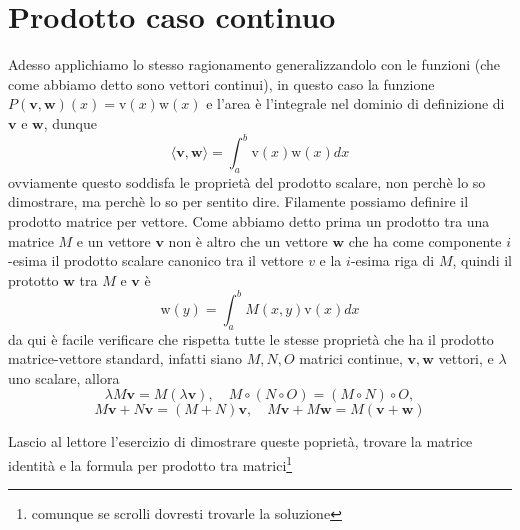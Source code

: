 \documentclass[11pt,a4paper]{report}
\newcommand{\vettore}[1]{\mathbf{#1}}
\newcommand{\vettorec}[1]{\textrm{#1}}
\newcommand{\pscal}[2]{\langle \vettore{#1},\vettore{#2}\rangle}
\theoremstyle{definition}
\theoremstyle{plain}
\theoremstyle{plain}
\begin{document}
		\section{Prodotto caso continuo}
			Adesso applichiamo lo stesso ragionamento generalizzandolo con le funzioni (che come abbiamo detto sono vettori continui), in questo caso la funzione $P(\vettore v,\vettore w)(x)=\vettorec v(x)\vettorec w(x)$ e l'area è l'integrale nel dominio di definizione di $\vettore v$ e $\vettore w$, dunque
			\begin{equation}
				\pscal{v}{w}=\int_a^b \vettorec v(x)\vettorec w(x)dx
			\end{equation}
			ovviamente questo soddisfa le proprietà del prodotto scalare, non perchè lo so dimostrare, ma perchè lo so per sentito dire.\newline
			Filamente possiamo definire il prodotto matrice per vettore. Come abbiamo detto prima un prodotto tra una matrice $M$ e un vettore $\vettore v$ non è altro che un vettore $\vettore w$ che ha come componente $i$-esima il prodotto scalare canonico tra il vettore $v$ e la $i$-esima riga di $M$, quindi il prototto $\vettore w$ tra $M$ e $\vettore v$ è
			\begin{equation}
				\vettorec w(y)=\int_a^b M(x,y)\vettorec v(x) dx
			\end{equation}
			da qui è facile verificare che rispetta tutte le stesse proprietà che ha il prodotto matrice-vettore standard, infatti siano $M, N, O$ matrici continue, $\vettore v,\vettore w$ vettori, e $\lambda$ uno scalare, allora 
			\begin{equation}
				\lambda M\vettore v= M(\lambda \vettore v),\quad M\circ (N \circ O)= (M \circ N) \circ O,
			\end{equation}
			\[
				M\vettore v + N\vettore v=  (M+N)\vettore v,\quad M\vettore v+M\vettore w=M(\vettore v+\vettore w)
			\]
			
			Lascio al lettore l'esercizio di dimostrare queste poprietà, trovare la matrice identità e la formula per prodotto tra matrici\footnote{comunque se scrolli dovresti trovarle la soluzione}
		
\end{document}
